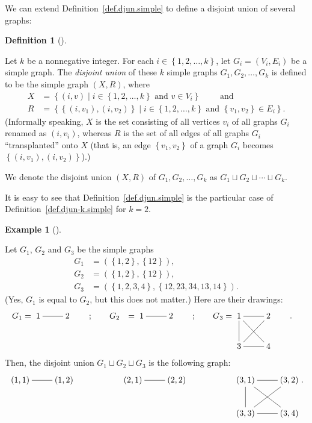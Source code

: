 \documentclass[numbers=enddot,12pt,final,onecolumn,notitlepage]{scrartcl}%
\makeatletter
\theoremstyle{definition}
\newtheorem{defi}[theo]{Definition}
\newenvironment{definition}[1][]
{\begin{defi}[#1]\begin{leftbar}}
{\end{leftbar}\end{defi}}
\newtheorem{exam}[theo]{Example}
\newenvironment{example}[1][]
{\begin{exam}[#1]\begin{leftbar}}
{\end{leftbar}\end{exam}}
\newcommand{\set}[1]{\left\{ #1 \right\}}
\newcommand{\tup}[1]{\left( #1 \right)}
\newcommand{\are}{\ar@{-}}
\makeatother
\begin{document}
We can extend Definition~\ref{def.djun.simple} to define
a disjoint union of several graphs:

\begin{definition} \label{def.djun-k.simple}
Let $k$ be a nonnegative integer.
For each $i \in \set{1, 2, \ldots, k}$, let
$G_i = \tup{V_i, E_i}$ be a simple graph.
The \textit{disjoint union} of these $k$ simple graphs
$G_1, G_2, \ldots, G_k$ is defined to be
the simple graph $\tup{X, R}$, where
\begin{align*}
X &= \set{ \tup{i, v} \mid i \in \set{1, 2, \ldots, k}
                           \text{ and } v \in V_i }
\qquad \text{ and} \\
R &= \set{ \set{\tup{i, v_1}, \tup{i, v_2}} \mid
               i \in \set{1, 2, \ldots, k}
                           \text{ and } \set{v_1, v_2} \in E_i } .
\end{align*}
(Informally speaking, $X$ is the set consisting of all vertices
$v_i$ of all graphs $G_i$ renamed as $\tup{i, v_i}$, whereas
$R$ is the set of all edges of all graphs $G_i$ ``transplanted''
onto $X$ (that is, an edge $\set{v_1, v_2}$ of a graph $G_i$
becomes $\set{\tup{i, v_1}, \tup{i, v_2}}$).)

We denote the disjoint union $\tup{X, R}$ of
$G_1, G_2, \ldots, G_k$ as
$G_1 \sqcup G_2 \sqcup \cdots \sqcup G_k$.
\end{definition}

It is easy to see that Definition~\ref{def.djun.simple} is
the particular case of Definition~\ref{def.djun-k.simple}
for $k = 2$.

\Needspace{15pc}
\begin{example}
Let $G_1$, $G_2$ and $G_3$ be the simple graphs
\begin{align*}
G_1 &= \tup{ \set{1, 2}, \set{12} }, \\
G_2 &= \tup{ \set{1, 2}, \set{12} }, \\
G_3 &= \tup{ \set{1, 2, 3, 4}, \set{12, 23, 34, 13, 14} }.
\end{align*}
(Yes, $G_1$ is equal to $G_2$, but this does not matter.)
Here are their drawings:
\begin{align*}
G_1 &= \xymatrix{
1 \are[r] & 2
}
\qquad ; \qquad
G_2 &= \xymatrix{
1 \are[r] & 2
}
\qquad ; \qquad
G_3 &= \xymatrix{
1 \are[r] \are[d] \are[dr] & 2 \are[dl] \\
3 \are[r] & 4
}
\qquad .
\end{align*}
Then, the disjoint union $G_1 \sqcup G_2 \sqcup G_3$ is the
following graph:
\[
\xymatrix{
\tup{1,1} \are[r] & \tup{1,2} & &
\tup{2,1} \are[r] & \tup{2,2} & &
\tup{3,1} \are[r] \are[d] \are[dr] & \tup{3,2} \are[dl] \\
& & & & & & \tup{3,3} \are[r] & \tup{3,4}
}
.
\]
\end{example}
\end{document}
